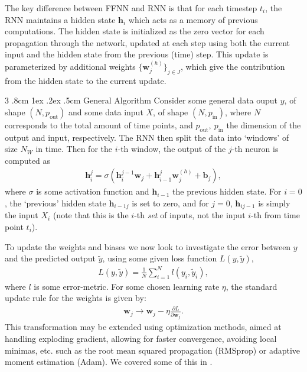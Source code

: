 \documentclass[%
reprint,
amsmath,amssymb,
aps,
]{revtex4-2}
\makeatletter
\renewcommand{\subsubsection}{%
	\@startsection
	{subsubsection}%
	{3}%
	{\z@}%
	{.8cm \@plus1ex \@minus .2ex}%
	{.5cm}%
	{\normalfont\small\centering}%
}
\makeatother
\begin{document}
The key difference between FFNN and RNN is that for each timestep \(t_i\), the RNN maintains a hidden state \(\boldsymbol{h}_i\) which acts as a memory of previous computations. The hidden state is initialized as the zero vector for each propagation through the network, updated at each step using both the current input and the hidden state from the previous (time) step. This update is parameterized by additional weights \(\{\boldsymbol{w}_{j}^{(h)}\}_{j\in J}\), which give the contribution from the hidden state to the current update.

\subsubsection{General Algorithm}
Consider some general data ouput \(y\), of shape \((N, p_{\text{out}})\) and some data input \(X\), of shape \((N, p_{\text{in}})\), where \(N\) corresponds to the total amount of time points, and \(p_{\text{out}}, \ p_{\text{in}}\) the dimension of the output and input, respectively. The RNN then split the data into `windows' of size \(N_{W}\) in time. Then for the \(i\)-th window, the output of the \(j\)-th neuron is computed as
\begin{align}
	\boldsymbol{h}_{i}^{j} = \sigma\left(\boldsymbol{h}_{i}^{j-1} \boldsymbol{w}_{j} + \boldsymbol{h}_{i-1}^{j} \boldsymbol{w}^{(h)}_{j} + \boldsymbol{b}_{j}\right),
\end{align}
where \(\sigma\) is some activation function and \(\boldsymbol{h}_{i-1}\) the previous hidden state. For \(i=0\), the `previous' hidden state \(\boldsymbol{h}_{i-1j}\) is set to zero, and for \(j=0\), \(\boldsymbol{h}_{ij-1}\) is simply the input \(X_{i}\) (note that this is the \(i\)-th \emph{set} of inputs, not the input \(i\)-th from time point \(t_{i}\)).

To update the weights and biases we now look to investigate the error between \(y\) and the predicted output \(\tilde{y}\), using some given loss function \(L(y, \tilde{y})\),
\begin{align}	
	L(y,\tilde{y}) = \frac{1}{N}\sum\limits_{i=1}^{N} l(y_{i}, \tilde{y}_i),
\end{align}
where \(l\) is some error-metric. 
For some chosen learning rate \(\eta\), the standard update rule for the weights is given by:
\begin{align}
	\boldsymbol{w}_{j}\rightarrow \boldsymbol{w}_{j} - \eta \frac{\partial L}{\partial \boldsymbol{w}_{j}}.
\end{align}
This transformation may be extended using optimization methods, aimed at handling exploding gradient, allowing for faster convergence, avoiding local minimas, etc. such as the root mean squared propagation (RMSprop) or adaptive moment estimation (Adam). We covered some of this in \cite{project2}.
\end{document}

